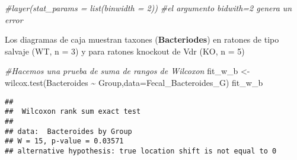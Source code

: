 \documentclass[
]{article}
\newenvironment{Shaded}{\begin{snugshade}}{\end{snugshade}}
\newcommand{\AttributeTok}[1]{\textcolor[rgb]{0.77,0.63,0.00}{#1}}
\newcommand{\CommentTok}[1]{\textcolor[rgb]{0.56,0.35,0.01}{\textit{#1}}}
\newcommand{\FunctionTok}[1]{\textcolor[rgb]{0.00,0.00,0.00}{#1}}
\newcommand{\NormalTok}[1]{#1}
\newcommand{\OtherTok}[1]{\textcolor[rgb]{0.56,0.35,0.01}{#1}}
\newcommand{\SpecialCharTok}[1]{\textcolor[rgb]{0.00,0.00,0.00}{#1}}
\begin{document}
\begin{Shaded}
\begin{Highlighting}[]
  \CommentTok{\#layer(stat\_params = list(binwidth = 2))}
\CommentTok{\#el argumento bidwith=2 genera un error}
\end{Highlighting}
\end{Shaded}

Los diagramas de caja muestran taxones (\textbf{Bacteriodes}) en ratones
de tipo salvaje (WT, n = 3) y para ratones knockout de Vdr (KO, n = 5)

\begin{Shaded}
\begin{Highlighting}[]
\CommentTok{\#Hacemos una prueba de suma de rangos de Wilcoxon}
\NormalTok{fit\_w\_b }\OtherTok{\textless{}{-}} \FunctionTok{wilcox.test}\NormalTok{(Bacteroides }\SpecialCharTok{\textasciitilde{}}\NormalTok{ Group,}\AttributeTok{data=}\NormalTok{Fecal\_Bacteroides\_G)}
\NormalTok{fit\_w\_b}
\end{Highlighting}
\end{Shaded}

\begin{verbatim}
## 
##  Wilcoxon rank sum exact test
## 
## data:  Bacteroides by Group
## W = 15, p-value = 0.03571
## alternative hypothesis: true location shift is not equal to 0
\end{verbatim}
\end{document}
